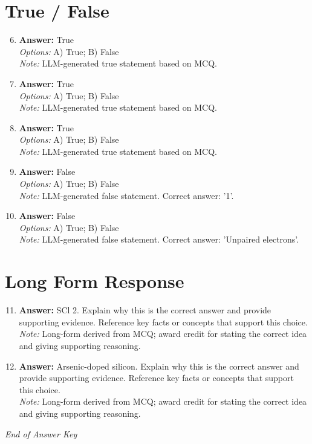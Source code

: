 \documentclass[12pt]{article}
\begin{document}
\section*{True / False}
\begin{enumerate}[label=\arabic*.]
\setcounter{enumi}{5}
\item \textbf{Answer:} True
\\ \textit{Options:} A) True; B) False
\\ \textit{Note:} LLM-generated true statement based on MCQ.
\item \textbf{Answer:} True
\\ \textit{Options:} A) True; B) False
\\ \textit{Note:} LLM-generated true statement based on MCQ.
\item \textbf{Answer:} True
\\ \textit{Options:} A) True; B) False
\\ \textit{Note:} LLM-generated true statement based on MCQ.
\item \textbf{Answer:} False
\\ \textit{Options:} A) True; B) False
\\ \textit{Note:} LLM-generated false statement. Correct answer: '1'.
\item \textbf{Answer:} False
\\ \textit{Options:} A) True; B) False
\\ \textit{Note:} LLM-generated false statement. Correct answer: 'Unpaired electrons'.
\end{enumerate}

\section*{Long Form Response}
\begin{enumerate}[label=\arabic*.]
\setcounter{enumi}{10}
\item \textbf{Answer:} SCl 2. Explain why this is the correct answer and provide supporting evidence. Reference key facts or concepts that support this choice.
\\ \textit{Note:} Long-form derived from MCQ; award credit for stating the correct idea and giving supporting reasoning.
\item \textbf{Answer:} Arsenic-doped silicon. Explain why this is the correct answer and provide supporting evidence. Reference key facts or concepts that support this choice.
\\ \textit{Note:} Long-form derived from MCQ; award credit for stating the correct idea and giving supporting reasoning.
\end{enumerate}

\vfill
\noindent\textit{End of Answer Key}
\end{document}
